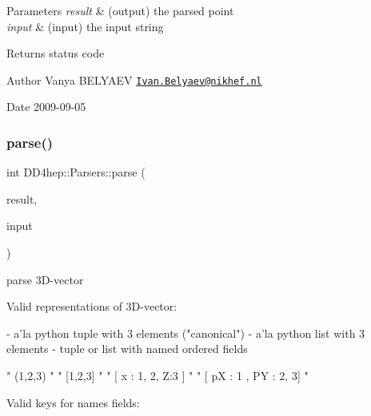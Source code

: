 \begin{DoxyParams}{Parameters}
{\em result} & (output) the parsed point \\
\hline
{\em input} & (input) the input string \\
\hline
\end{DoxyParams}
\begin{DoxyReturn}{Returns}
status code 
\end{DoxyReturn}
\begin{DoxyAuthor}{Author}
Vanya B\+E\+L\+Y\+A\+EV \href{mailto:Ivan.Belyaev@nikhef.nl}{\tt Ivan.\+Belyaev@nikhef.\+nl} 
\end{DoxyAuthor}
\begin{DoxyDate}{Date}
2009-\/09-\/05 
\end{DoxyDate}
\hypertarget{namespace_d_d4hep_1_1_parsers_a55f47fe0c36c09f779f5aeefe17e9bcb}{}\label{namespace_d_d4hep_1_1_parsers_a55f47fe0c36c09f779f5aeefe17e9bcb} 
\subsubsection{\texorpdfstring{parse()}{parse()}\hspace{0.1cm}{\footnotesize\ttfamily [20/21]}}
{\footnotesize\ttfamily int D\+D4hep\+::\+Parsers\+::parse (\begin{DoxyParamCaption}\item[{R\+O\+O\+T\+::\+Math\+::\+X\+Y\+Z\+Vector \&}]{result,  }\item[{const std\+::string \&}]{input }\end{DoxyParamCaption})}



parse 3\+D-\/vector 

Valid representations of 3\+D-\/vector\+: \begin{DoxyVerb}- a'la python tuple with 3 elements ("canonical")
- a'la python list with 3 elements
- tuple or list with named ordered fields
\end{DoxyVerb}



\begin{DoxyCode}
\textcolor{stringliteral}{" (1,2,3) "}
\textcolor{stringliteral}{" [1,2,3] "}
\textcolor{stringliteral}{" [ x : 1, 2, Z:3 ] "}
\textcolor{stringliteral}{" [ pX : 1 , PY : 2, 3] "}
\end{DoxyCode}


Valid keys for names fields\+:


